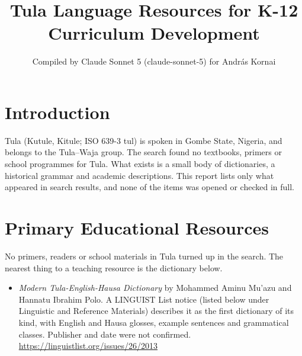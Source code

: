 \documentclass[12pt]{article}
\title{Tula Language Resources for K-12 Curriculum Development}
\author{Compiled by Claude Sonnet 5 (claude-sonnet-5) for Andr\'as Kornai}
\date{}
\begin{document}
\maketitle

\section{Introduction}
Tula (Kutule, Kitule; ISO 639-3 tul) is spoken in Gombe State, Nigeria, and belongs to the Tula--Waja group. The search found no textbooks, primers or school programmes for Tula. What exists is a small body of dictionaries, a historical grammar and academic descriptions. This report lists only what appeared in search results, and none of the items was opened or checked in full.

\section{Primary Educational Resources}
No primers, readers or school materials in Tula turned up in the search. The nearest thing to a teaching resource is the dictionary below.
\begin{itemize}
\item \emph{Modern Tula-English-Hausa Dictionary} by Mohammed Aminu Mu'azu and Hannatu Ibrahim Polo. A LINGUIST List notice (listed below under Linguistic and Reference Materials) describes it as the first dictionary of its kind, with English and Hausa glosses, example sentences and grammatical classes. Publisher and date were not confirmed. \url{https://linguistlist.org/issues/26/2013}
\end{itemize}
\end{document}
